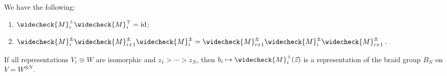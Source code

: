 \begin{theorem}
  We have the following:
  \begin{enumerate}
    \item $\widecheck{M}^{\pm}_i \widecheck{M}^{\mp}_i = \id$;
    \item $\widecheck{M}^{\pm}_i \widecheck{M}^{\pm}_{i + 1} \widecheck{M}^{\pm}_i = \widecheck{M}^{\pm}_{i + 1} \widecheck{M}^{\pm}_i \widecheck{M}^{\pm}_{i + 1}$.
  \end{enumerate}
\end{theorem}

\begin{corollary}
  If all representations
  $V_i \cong W$ are isomorphic
  and $z_1 > \cdots > z_N$, then
  $b_i \mapsto \widecheck{M}^{\pm}_i(\vec{z})$
  is a representation of the braid
  group $B_N$ on $V = W^{\otimes N}$.
\end{corollary}
